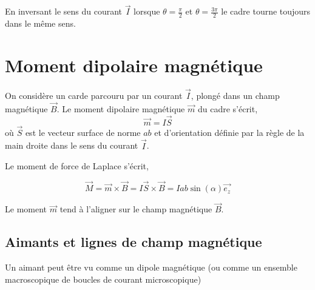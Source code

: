 \documentclass[
    11pt,
    a4paper,
    oneside,
    headinlcude, footinclude,
    twoside,
]{report}
\renewcommand{\vec}[1]{\overrightarrow{#1}}
\begin{document}
En inversant le sens du courant $\vec I$ lorsque $\theta= \frac{\pi}{2}$ et $\theta
= \frac{3\pi}{2}$ le cadre tourne toujours dans le même sens.

\section{Moment dipolaire magnétique}
\label{sec:moment_dipolaire_magnetique}

\begin{center}
    \begin{minipage}{.5\linewidth}
        \setlength{\parskip}{.3em}
        On considère un carde parcouru par un courant $\vec I$, plongé dans un
        champ magnétique $\vec B$. Le moment dipolaire magnétique $\vec m$ du
        cadre s'écrit, 
        \begin{equation}
            \label{eq:9.10} 
            \vec m = I \vec S 
        \end{equation}
        où $\vec S$ est le vecteur surface de norme $ab$ et d'orientation
        définie par la règle de la main droite dans le sens du courant $\vec I$.
        
    \end{minipage}
    \begin{minipage}{.49\linewidth}
    \end{minipage}
\end{center}


Le moment de force de Laplace s'écrit,

\begin{equation}
    \label{eq:9.11} 
    \vec M = \vec m \times \vec B = I \vec S \times \vec B = Iab \sin(\alpha)
    \vec{e_{z}}
\end{equation}

\begin{center}
\end{center}

Le moment $\vec m$ tend à l'aligner sur le champ magnétique $\vec B$.

\subsection{Aimants et lignes de champ magnétique}
\label{sub:aimants_et_lignes_de_champ_magnetique}

Un aimant peut être vu comme un dipole magnétique (ou comme un ensemble macroscopique
de boucles de courant microscopique)
\end{document}
